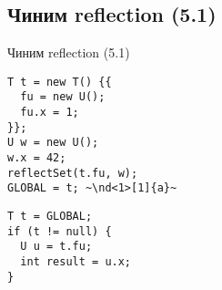 %
\ifrender
\subsection{Чиним reflection (5.1)}
\begin{frame}[fragile]{Чиним reflection (5.1)}
%
\begin{minipage}{0.5\textwidth}
	\begin{lstlisting}
T t = new T() {{
  fu = new U();
  fu.x = 1;
}};
U w = new U();
w.x = 42;
reflectSet(t.fu, w);
GLOBAL = t; ~\nd<1>[1]{a}~
	\end{lstlisting}
\end{minipage}%
\begin{minipage}{0.5\textwidth}
	\begin{lstlisting}[title=Thread 2]
T t = GLOBAL;
if (t != null) {
  U u = t.fu;
  int result = u.x;
}
	\end{lstlisting}
\end{minipage}

\begin{center}
%
\end{center}
\end{frame}
\fi
